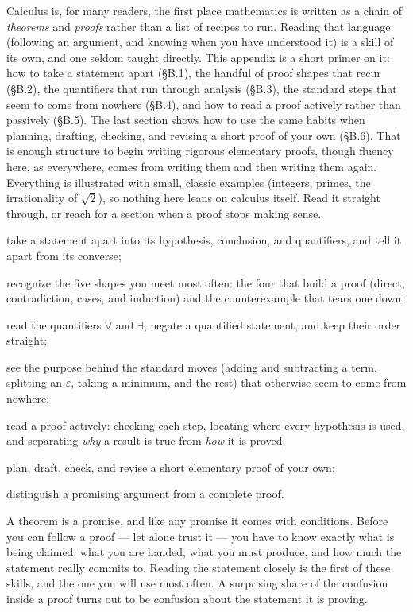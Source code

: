 \documentclass[a4paper,12pt,oneside]{memoir}
\begin{document}
\begin{lead}
Calculus is, for many readers, the first place mathematics is written as a chain of \emph{theorems} and \emph{proofs} rather than a list of recipes to run. Reading that language (following an argument, and knowing when you have understood it) is a skill of its own, and one seldom taught directly. This appendix is a short primer on it: how to take a statement apart (§B.1), the handful of proof shapes that recur (§B.2), the quantifiers that run through analysis (§B.3), the standard steps that seem to come from nowhere (§B.4), and how to read a proof actively rather than passively (§B.5). The last section shows how to use the same habits when planning, drafting, checking, and revising a short proof of your own (§B.6). That is enough structure to begin writing rigorous elementary proofs, though fluency here, as everywhere, comes from writing them and then writing them again. Everything is illustrated with small, classic examples (integers, primes, the irrationality of \(\sqrt{2}\)), so nothing here leans on calculus itself. Read it straight through, or reach for a section when a proof stops making sense.
\end{lead}
\begin{objectives}
  \item take a statement apart into its hypothesis, conclusion, and quantifiers, and tell it apart from its converse;
  \item recognize the five shapes you meet most often: the four that build a proof (direct, contradiction, cases, and induction) and the counterexample that tears one down;
  \item read the quantifiers \(\forall\) and \(\exists\), negate a quantified statement, and keep their order straight;
  \item see the purpose behind the standard moves (adding and subtracting a term, splitting an \(\varepsilon\), taking a minimum, and the rest) that otherwise seem to come from nowhere;
  \item read a proof actively: checking each step, locating where every hypothesis is used, and separating \emph{why} a result is true from \emph{how} it is proved;
  \item plan, draft, check, and revise a short elementary proof of your own;
  \item distinguish a promising argument from a complete proof.
\end{objectives}
A theorem is a promise, and like any promise it comes with conditions. Before you can follow a proof — let alone trust it — you have to know exactly what is being claimed: what you are handed, what you must produce, and how much the statement really commits to. Reading the statement closely is the first of these skills, and the one you will use most often. A surprising share of the confusion inside a proof turns out to be confusion about the statement it is proving.
\end{document}
